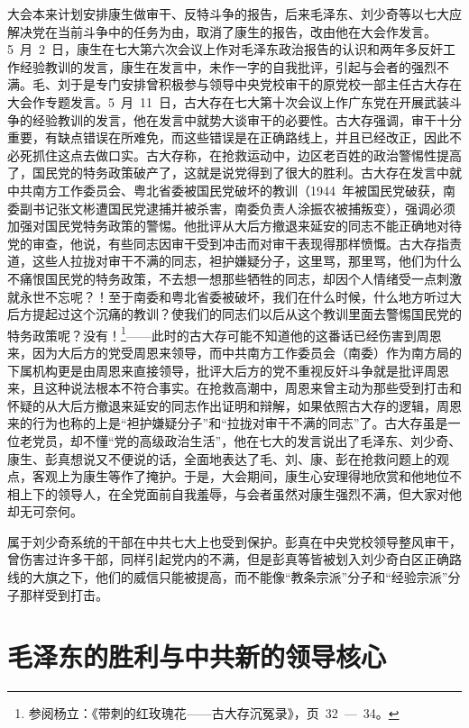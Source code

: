 大会本来计划安排康生做审干、反特斗争的报告，后来毛泽东、刘少奇等以七大应解决党在当前斗争中的任务为由，取消了康生的报告，改由他在大会作发言。5~月~2~日，康生在七大第六次会议上作对毛泽东政治报告的认识和两年多反奸工作经验教训的发言，康生在发言中，未作一字的自我批评，引起与会者的强烈不满。毛、刘于是专门安排曾积极参与领导中央党校审干的原党校一部主任古大存在大会作专题发言。5~月~11~日，古大存在七大第十次会议上作广东党在开展武装斗争的经验教训的发言，他在发言中就势大谈审干的必要性。古大存强调，审干十分重要，有缺点错误在所难免，而这些错误是在正确路线上，并且已经改正，因此不必死抓住这点去做口实。古大存称，在抢救运动中，边区老百姓的政治警惕性提高了，国民党的特务政策破产了，这就是说党得到了很大的胜利。古大存在发言中就中共南方工作委员会、粤北省委被国民党破坏的教训（1944~年被国民党破获，南委副书记张文彬遭国民党逮捕并被杀害，南委负责人涂振农被捕叛变），强调必须加强对国民党特务政策的警惕。他批评从大后方撤退来延安的同志不能正确地对待党的审查，他说，有些同志因审干受到冲击而对审干表现得那样愤慨。古大存指责道，这些人拉拢对审干不满的同志，袒护嫌疑分子，这里骂，那里骂，他们为什么不痛恨国民党的特务政策，不去想一想那些牺牲的同志，却因个人情绪受一点刺激就永世不忘呢？！至于南委和粤北省委被破坏，我们在什么时候，什么地方听过大后方提起过这个沉痛的教训？使我们的同志们以后从这个教训里面去警惕国民党的特务政策呢？没有！\footnote{参阅杨立：《带刺的红玫瑰花——古大存沉冤录》，页~32~—~34。}——此时的古大存可能不知道他的这番话已经伤害到周恩来，因为大后方的党受周恩来领导，而中共南方工作委员会（南委）作为南方局的下属机构更是由周恩来直接领导，批评大后方的党不重视反奸斗争就是批评周恩来，且这种说法根本不符合事实。在抢救高潮中，周恩来曾主动为那些受到打击和怀疑的从大后方撤退来延安的同志作出证明和辩解，如果依照古大存的逻辑，周恩来的行为也称的上是“袒护嫌疑分子”和“拉拢对审干不满的同志”了。古大存虽是一位老党员，却不懂“党的高级政治生活”，他在七大的发言说出了毛泽东、刘少奇、康生、彭真想说又不便说的话，全面地表达了毛、刘、康、彭在抢救问题上的观点，客观上为康生等作了掩护。于是，大会期间，康生心安理得地欣赏和他地位不相上下的领导人，在全党面前自我羞辱，与会者虽然对康生强烈不满，但大家对他却无可奈何。

属于刘少奇系统的干部在中共七大上也受到保护。彭真在中央党校领导整风审干，曾伤害过许多干部，同样引起党内的不满，但是彭真等皆被划入刘少奇白区正确路线的大旗之下，他们的威信只能被提高，而不能像“教条宗派”分子和“经验宗派”分子那样受到打击。

\section{毛泽东的胜利与中共新的领导核心}

